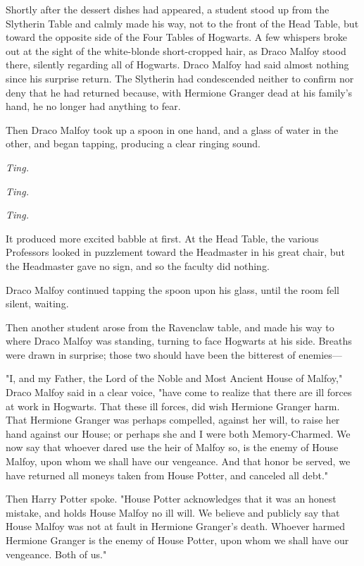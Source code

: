 Shortly after the dessert dishes had appeared, a student stood up from the Slytherin Table and calmly made his way, not to the front of the Head Table, but toward the opposite side of the Four Tables of Hogwarts. A few whispers broke out at the sight of the white-blonde short-cropped hair, as Draco Malfoy stood there, silently regarding all of Hogwarts. Draco Malfoy had said almost nothing since his surprise return. The Slytherin had condescended neither to confirm nor deny that he had returned because, with Hermione Granger dead at his family's hand, he no longer had anything to fear.

Then Draco Malfoy took up a spoon in one hand, and a glass of water in the other, and began tapping, producing a clear ringing sound.

\emph{Ting.}

\emph{Ting.}

\emph{Ting.}

It produced more excited babble at first. At the Head Table, the various Professors looked in puzzlement toward the Headmaster in his great chair, but the Headmaster gave no sign, and so the faculty did nothing.

Draco Malfoy continued tapping the spoon upon his glass, until the room fell silent, waiting.

Then another student arose from the Ravenclaw table, and made his way to where Draco Malfoy was standing, turning to face Hogwarts at his side. Breaths were drawn in surprise; those two should have been the bitterest of enemies---

"I, and my Father, the Lord of the Noble and Most Ancient House of Malfoy," Draco Malfoy said in a clear voice, "have come to realize that there are ill forces at work in Hogwarts. That these ill forces, did wish Hermione Granger harm. That Hermione Granger was perhaps compelled, against her will, to raise her hand against our House; or perhaps she and I were both Memory-Charmed. We now say that whoever dared use the heir of Malfoy so, is the enemy of House Malfoy, upon whom we shall have our vengeance. And that honor be served, we have returned all moneys taken from House Potter, and canceled all debt."

Then Harry Potter spoke. "House Potter acknowledges that it was an honest mistake, and holds House Malfoy no ill will. We believe and publicly say that House Malfoy was not at fault in Hermione Granger's death. Whoever harmed Hermione Granger is the enemy of House Potter, upon whom we shall have our vengeance. Both of us."

